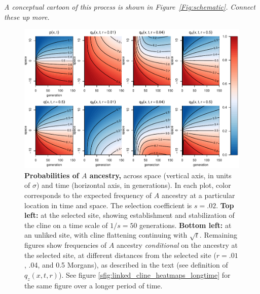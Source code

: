 \documentclass[11pt,letterpaper]{article}
\newcommand{\alisa}[1]{{\em \color{red} #1}}
\newcommand{\plr}[1]{{\em \color{blue} #1}}
\begin{document}
\alisa{A conceptual cartoon of this process is shown in Figure~\ref{Fig:schematic}.}
\plr{Connect these up more.}


\begin{figure}
    \includegraphics{figs/linked-frequencies}
    \caption{
        \textbf{Probabilities of $A$ ancestry,}
        across space (vertical axis, in units of $\sigma$) 
        and time (horizontal axis, in generations).
        In each plot, color corresponds to the expected frequency of $A$ ancestry
        at a particular location in time and space.
        The selection coefficient is $s=.02$.
        \textbf{Top left:} at the selected site, showing establishment and stabilization of the cline
        on a time scale of $1/s=50$ generations.
        \textbf{Bottom left:} at an unliked site,
        with cline flattening continuing with $\sqrt{t}$.
        Remaining figures show frequencies of $A$ ancestry \emph{conditional}
        on the ancestry at the selected site,
        at different distances from the selected site ($r=.01$, .04, and 0.5 Morgans),
        as described in the text (see definition of $q_z(x,t,r)$).
        See figure \ref{sfig:linked_cline_heatmaps_longtime}
        for the same figure over a longer period of time.
    }
    \label{fig:linked_cline_heatmaps}
\end{figure}
\end{document}
